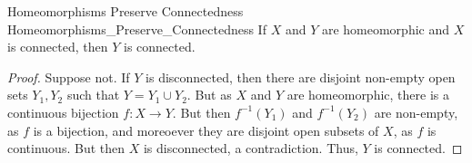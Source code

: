     \begin{ltheorem}{Homeomorphisms Preserve Connectedness}
                    {Homeomorphisms_Preserve_Connectedness}
        If $X$ and $Y$ are homeomorphic and
        $X$ is connected, then $Y$ is connected.
    \end{ltheorem}
    \begin{proof}
        Suppose not. If $Y$ is disconnected, then there are disjoint
        non-empty open sets $Y_{1},Y_{2}$ such that
        $Y=Y_{1}\cup{Y_{2}}$. But as $X$ and $Y$ are homeomorphic,
        there is a continuous bijection $f:X\rightarrow{Y}$. But then
        $f^{-1}(Y_{1})$ and $f^{-1}(Y_{2})$ are non-empty, as $f$ is a
        bijection, and moreoever they are disjoint open subsets of $X$,
        as $f$ is continuous. But then $X$ is disconnected,
        a contradiction. Thus, $Y$ is connected.
    \end{proof}
